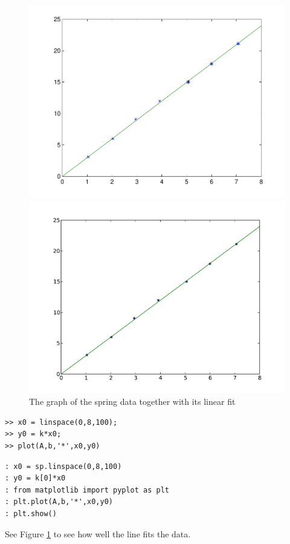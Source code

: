 \begin{figure}[h!]
\label{fig1}
\begin{center}
\begin{matlab}
\includegraphics[scale = .6]{./FiguresMAT/lab9_line}
\end{matlab}
\begin{python}
\includegraphics[scale = .6]{./Figures/lab9_line_py}
\end{python}
\caption{The graph of the spring data together with its linear fit}
\label{Fig:SpringFit}
\end{center}
\end{figure}

\begin{matlab}
\begin{lstlisting}[style=matlab]
>> x0 = linspace(0,8,100);
>> y0 = k*x0;
>> plot(A,b,'*',x0,y0)
\end{lstlisting}
\end{matlab}
\begin{python}
\begin{lstlisting}[style=python]
: x0 = sp.linspace(0,8,100)
: y0 = k[0]*x0
: from matplotlib import pyplot as plt
: plt.plot(A,b,'*',x0,y0)
: plt.show()
\end{lstlisting}
\end{python}
See Figure \ref{Fig:SpringFit} to see how well the line fits the data.


